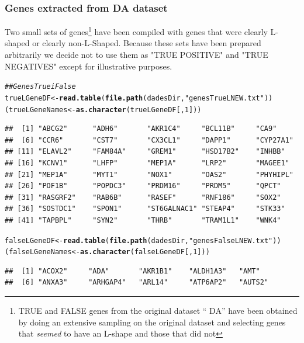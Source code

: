 \documentclass[a4paper,10pt]{article}\usepackage[]{graphicx}\usepackage[]{color}
\makeatletter
\newcommand{\hlnum}[1]{\textcolor[rgb]{0.686,0.059,0.569}{#1}}%
\newcommand{\hlstr}[1]{\textcolor[rgb]{0.192,0.494,0.8}{#1}}%
\newcommand{\hlcom}[1]{\textcolor[rgb]{0.678,0.584,0.686}{\textit{#1}}}%
\newcommand{\hlstd}[1]{\textcolor[rgb]{0.345,0.345,0.345}{#1}}%
\newcommand{\hlkwb}[1]{\textcolor[rgb]{0.69,0.353,0.396}{#1}}%
\newcommand{\hlkwd}[1]{\textcolor[rgb]{0.737,0.353,0.396}{\textbf{#1}}}%
\newenvironment{kframe}{%
 \def\at@end@of@kframe{}%
 \ifinner\ifhmode%
  \def\at@end@of@kframe{\end{minipage}}%
  \begin{minipage}{\columnwidth}%
 \fi\fi%
 \def\FrameCommand##1{\hskip\@totalleftmargin \hskip-\fboxsep
 \colorbox{shadecolor}{##1}\hskip-\fboxsep
     \hskip-\linewidth \hskip-\@totalleftmargin \hskip\columnwidth}%
 \MakeFramed {\advance\hsize-\width
   \@totalleftmargin\z@ \linewidth\hsize
   \@setminipage}}%
 {\par\unskip\endMakeFramed%
 \at@end@of@kframe}
\newenvironment{knitrout}{}{} %
\makeatother
\begin{document}
\subsubsection{Genes extracted from DA dataset}

Two small sets of genes\footnote{TRUE and FALSE genes from the original dataset `` DA'' have been obtained by doing an extensive  sampling on the original dataset and selecting genes that \emph{seemed} to have an L-shape and those that did not} have been compiled with genes that were clearly L-shaped or clearly non-L-Shaped. Because these sets have been prepared arbitrarily we decide not to use them as "TRUE POSITIVE" and "TRUE NEGATIVES" except for illustrative purposes.

\begin{knitrout}
\color{fgcolor}\begin{kframe}
\begin{alltt}
\hlcom{## Genes True i False}
\hlstd{trueLGeneDF} \hlkwb{<-}\hlkwd{read.table}\hlstd{(}\hlkwd{file.path}\hlstd{(dadesDir,} \hlstr{"genesTrueLNEW.txt"}\hlstd{))}
\hlstd{(trueLGeneNames} \hlkwb{<-} \hlkwd{as.character}\hlstd{(trueLGeneDF[,}\hlnum{1}\hlstd{]))}
\end{alltt}
\begin{verbatim}
##  [1] "ABCG2"      "ADH6"       "AKR1C4"     "BCL11B"     "CA9"       
##  [6] "CCR6"       "CST7"       "CX3CL1"     "DAPP1"      "CYP27A1"   
## [11] "ELAVL2"     "FAM84A"     "GREM1"      "HSD17B2"    "INHBB"     
## [16] "KCNV1"      "LHFP"       "MEP1A"      "LRP2"       "MAGEE1"    
## [21] "MEP1A"      "MYT1"       "NOX1"       "OAS2"       "PHYHIPL"   
## [26] "POF1B"      "POPDC3"     "PRDM16"     "PRDM5"      "QPCT"      
## [31] "RASGRF2"    "RAB6B"      "RASEF"      "RNF186"     "SOX2"      
## [36] "SOSTDC1"    "SPON1"      "ST6GALNAC1" "STEAP4"     "STK33"     
## [41] "TAPBPL"     "SYN2"       "THRB"       "TRAM1L1"    "WNK4"
\end{verbatim}
\begin{alltt}
\hlstd{falseLGeneDF} \hlkwb{<-} \hlkwd{read.table}\hlstd{(}\hlkwd{file.path}\hlstd{(dadesDir,} \hlstr{"genesFalseLNEW.txt"}\hlstd{))}
\hlstd{(falseLGeneNames} \hlkwb{<-} \hlkwd{as.character}\hlstd{(falseLGeneDF[,}\hlnum{1}\hlstd{]))}
\end{alltt}
\begin{verbatim}
##  [1] "ACOX2"     "ADA"       "AKR1B1"    "ALDH1A3"   "AMT"      
##  [6] "ANXA3"     "ARHGAP4"   "ARL14"     "ATP6AP2"   "AUTS2"    

\end{verbatim}
\end{kframe}
\end{knitrout}
\end{document}
